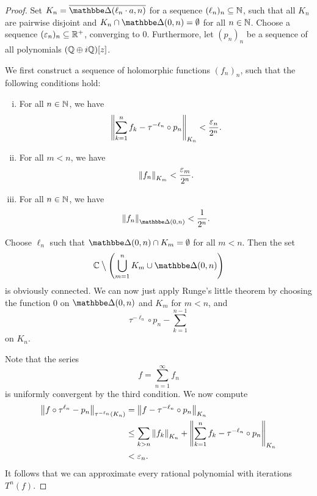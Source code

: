 \begin{proof}
Set $K_n = \oline{\dsk(\ell_n \cdot a, n)}$ for a sequence
$(\ell_n)_n \subseteq \mathbb{N}$, such that all $K_n$ are pairwise
disjoint and $K_n \cap \dsk(0, n) = \emptyset$ for all $n \in \mathbb{N}$.
Choose a sequence $(\varepsilon_n)_n \subseteq \mathbb{R}^+$, converging to
$0$. Furthermore, let $(p_n)_n$ be a sequence of all polynomials
$(\mathbb{Q} \oplus i\mathbb{Q})[z]$.

We first construct a sequence of holomorphic functions $(f_n)_n$,
such that the following conditions hold:

\begin{enumerate}[i)]
\item For all $n \in \mathbb{N}$, we have
\[
\left\lVert \sum_{k=1}^n f_k - \tau^{-\ell_n} \circ p_n\right\rVert_{K_n} <
\frac{\varepsilon_n}{2^n}.
\]
\item For all $m < n$, we have
\[
\left\lVert f_n\right\rVert_{K_m} < \frac{\varepsilon_m}{2^n}.
\]
\item For all $n \in \mathbb{N}$, we have
\[
\norm{f_n}_{\dsk(0,n)} < \frac{1}{2^n}.
\]
\end{enumerate}

Choose $\ell_n$ such that $\dsk(0,n) \cap K_m = \emptyset$ for all
$m < n$. Then the set
\[
\C \bigsetminus \br{\bigcup_{m=1}^n K_m \cup \dsk(0,n)}
\]
is obviously connected. We can now just apply Runge's little
theorem by choosing the function $0$ on $\dsk(0,n)$ and $K_m$ for
$m < n$, and
\[
\tau^{-\ell_n} \circ p_n - \sum_{k=1}^{n-1}
\]
on $K_n$.

Note that the series
\[
f = \sum_{n=1}^\infty f_n
\]
is uniformly convergent by the third condition. We now compute
\begin{align*}
\left\lVert f \circ \tau^{\ell_n} - p_n\right\rVert_{\tau^{-\ell_n}(K_n)} &=
\left\lVert f - \tau^{-\ell_n} \circ p_n\right\rVert_{K_n}
\\
&\leq
\sum_{k > n} \left\lVert f_k\right\rVert_{K_n} +
\left\lVert \sum_{k=1}^n f_k - \tau^{-\ell_n} \circ p_n\right\rVert_{K_n}
\\
&<
\varepsilon_n.
\end{align*}
It follows that we can approximate every rational polynomial with
iterations $T^n(f)$.
\end{proof}

